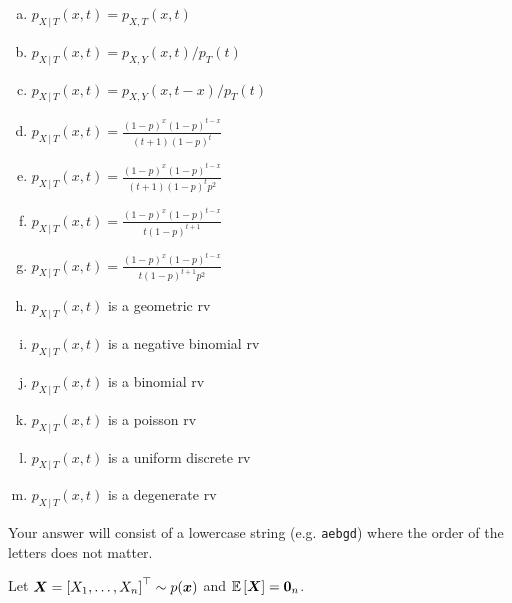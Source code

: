 \documentclass[12pt,landscape]{article}
\newcommand{\instr}{\small Your answer will consist of a lowercase string (e.g. \texttt{aebgd}) where the order of the letters does not matter. \normalsize}
\begin{document}
\begin{enumerate}[(a)]
\item $p_{X\,|\,T}(x,t) = p_{X,T}(x,t)$
\item $p_{X\,|\,T}(x,t) = p_{X,Y}(x,t) / p_T(t)$
\item $p_{X\,|\,T}(x,t) = p_{X,Y}(x,t-x) / p_T(t)$
\item $p_{X\,|\,T}(x,t) = \displaystyle \frac{(1-p)^x (1-p)^{t-x}}{(t+1) (1-p)^t}$
\item $p_{X\,|\,T}(x,t) = \displaystyle \frac{(1-p)^x (1-p)^{t-x}}{(t+1) (1-p)^t p^2}$
\item $p_{X\,|\,T}(x,t) = \displaystyle \frac{(1-p)^x (1-p)^{t-x}}{t (1-p)^{t+1}}$
\item $p_{X\,|\,T}(x,t) = \displaystyle \frac{(1-p)^x (1-p)^{t-x}}{t (1-p)^{t+1} p^2}$
\item $p_{X\,|\,T}(x,t)$ is a geometric rv
\item $p_{X\,|\,T}(x,t)$ is a negative binomial rv
\item $p_{X\,|\,T}(x,t)$ is a binomial rv
\item $p_{X\,|\,T}(x,t)$ is a poisson rv
\item $p_{X\,|\,T}(x,t)$ is a uniform discrete rv
\item $p_{X\,|\,T}(x,t)$ is a degenerate rv
\end{enumerate}
\eenum\instr\pagebreak





\problem{} Let $\boldsymbol{X} = \left[X_1, \ldots, X_n\right]^\top \sim p(\boldsymbol{x})$ and $\mathbb{E}\left[\boldsymbol{X}\right] = \boldsymbol{0}_n$.

\vspace{-0.2cm}\benum{} 
\end{document}
